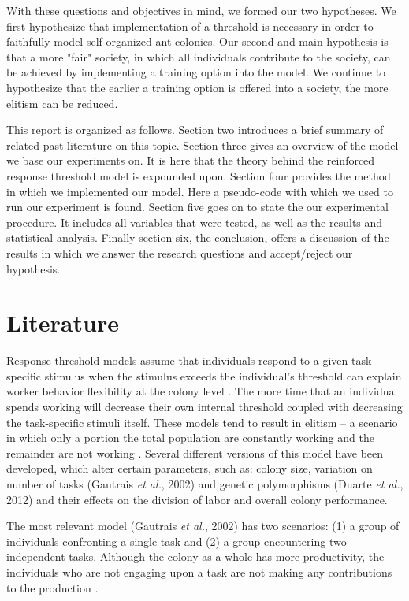 \documentclass[a4paper]{article}
\begin{document}
With these questions and objectives in mind, we formed our two hypotheses. We first hypothesize that implementation of a threshold is necessary in order to faithfully model self-organized ant colonies. Our second and main hypothesis is that a more "fair" society, in which all individuals contribute to the society, can be achieved by implementing a training option into the model. We continue to hypothesize that the earlier a training option is offered into a society, the more elitism can be reduced.   

This report is organized as follows. Section two introduces a brief summary of related past literature on this topic. Section three gives an overview of the model we base our experiments on. It is here that the theory behind the reinforced response threshold model is expounded upon. Section four provides the method in which we implemented our model. Here a pseudo-code with which we used to run our experiment is found. Section five goes on to state the our experimental procedure. It includes all variables that were tested, as well as the results and statistical analysis. Finally section six, the conclusion, offers a discussion of the results in which we answer the research questions and accept/reject our hypothesis. 



\section{Literature}
Response threshold models assume that individuals respond to a given task-specific stimulus when the stimulus exceeds the individual’s threshold can explain worker behavior flexibility at the colony level \cite{bonabeau}.  The more time that an individual spends working will decrease their own internal threshold coupled with decreasing the task-specific stimuli itself.   These models tend to result in elitism – a scenario in which only a portion the total population are constantly working and the remainder are not working \cite{Gautrais}\cite{evolution}\cite{bonabeau}. Several different versions of this model have been developed, which alter certain parameters, such as: colony size, variation on number of tasks (Gautrais \textit{et al.}, 2002) and genetic polymorphisms (Duarte \textit{et al.}, 2012) and their effects on the division of labor and overall colony performance.

The most relevant model (Gautrais \textit{et al.}, 2002) has two scenarios: (1) a group of individuals confronting a single task and (2) a group encountering two independent tasks.  Although the colony as a whole has more productivity, the individuals who are not engaging upon a task are not making any contributions to the production \cite{Gautrais}.   
\end{document}
